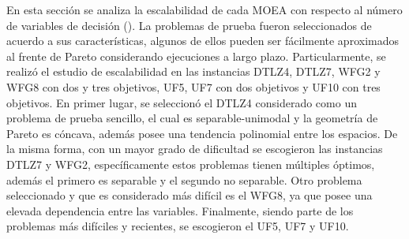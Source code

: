En esta sección se analiza la escalabilidad de cada MOEA con respecto al número de variables de decisión (\cite{maltese2016scalability}).
%
La problemas de prueba fueron seleccionados de acuerdo a sus características, algunos de ellos pueden ser fácilmente aproximados al frente de Pareto considerando ejecuciones a largo plazo.
%
%
%
Particularmente, se realizó el estudio de escalabilidad en las instancias DTLZ4, DTLZ7, WFG2 y WFG8 con dos y tres objetivos, UF5, UF7 con dos objetivos y UF10 con tres objetivos.
%
En primer lugar, se seleccionó el DTLZ4 considerado como un problema de prueba sencillo, el cual es separable-unimodal y la geometría de Pareto es cóncava, además posee una tendencia polinomial entre los espacios.
%
De la misma forma, con un mayor grado de dificultad se escogieron las instancias DTLZ7 y WFG2, específicamente estos problemas tienen múltiples óptimos, además el primero es separable y el segundo no separable.
%
Otro problema seleccionado y que es considerado más difícil es el WFG8, ya que posee una elevada dependencia entre las variables.
%
Finalmente, siendo parte de los problemas más difíciles y recientes, se escogieron el UF5, UF7 y UF10.
%

